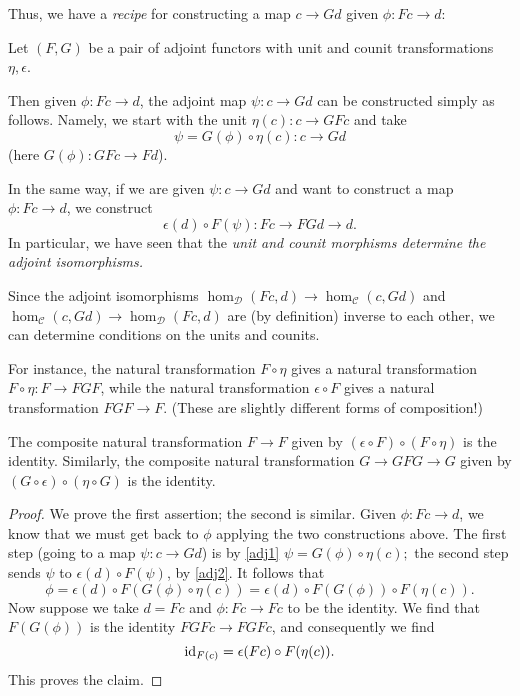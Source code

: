 Thus, we have a \emph{recipe} for constructing a map $c \to Gd$ given $\phi: Fc \to
d$:
\begin{proposition}
Let $(F, G)$ be a pair of adjoint functors with unit and counit transformations
$\eta, \epsilon$.

Then given $\phi: Fc \to d$, the adjoint map $\psi:c \to Gd$ can be constructed simply as
follows.
Namely, we start with the unit $\eta(c): c \to GF c$ and take
\begin{equation} \label{adj1} \psi =  G(\phi) \circ \eta(c): c \to Gd
\end{equation} (here $G(\phi): GFc \to Fd$).
\end{proposition}

In the same way, if we are given $\psi: c \to Gd$ and want to construct a map
$\phi: Fc \to d$, we construct
\begin{equation} \label{adj2} \epsilon(d) \circ  F(\psi): Fc \to FGd \to   d.
\end{equation}
In particular, we have seen that the \emph{unit and counit morphisms determine
the adjoint isomorphisms.}


Since the adjoint isomorphisms $\hom_{\mathcal{D}}(Fc, d) \to
\hom_{\mathcal{C}}(c, Gd)$ and 
$\hom_{\mathcal{C}}(c, Gd) \to \hom_{\mathcal{D}}(Fc, d) 
$
are (by definition) inverse to each other, we can determine
conditions on the units and counits.

For
instance, the natural transformation $F \circ \eta$ gives a natural
transformation $F \circ \eta: F \to FGF$, while the natural transformation
$\epsilon \circ F$ gives a natural transformation $FGF \to F$.
(These are slightly different forms of composition!)

\begin{lemma}  The composite natural transformation $F \to F$ given by
$(\epsilon \circ F) \circ (F \circ \eta)$ is the identity. 
Similarly, the composite natural transformation
$G \to GFG \to G$ given by $(G \circ \epsilon) \circ (\eta \circ G)$ is the
identity.
\end{lemma} 


\begin{proof} We prove the first assertion; the second is similar.
Given $\phi: Fc \to d$, we know that we must get back to $\phi$ applying the
two constructions above. The first step (going to a map $\psi: c \to Gd$) is by 
\eqref{adj1}
\( \psi = G(\phi) \circ \eta(c);  \) the second step sends $\psi$ to
$\epsilon(d) \circ F(\psi)$, by \eqref{adj2}.
It follows that
\[ \phi = \epsilon(d) \circ F( G(\phi) \circ \eta(c)) = \epsilon(d) \circ
F(G(\phi)) \circ F(\eta(c)). \]
Now suppose we take $d = Fc$ and $\phi: Fc \to Fc $ to be the identity.
We find that $F(G(\phi))$ is the identity $FGFc \to FGFc$, and consequently we
find
\[ \operatorname{id}_{F(c)} = \epsilon(Fc) \circ F(\eta(c)). \]
This proves the claim.
\end{proof} 



